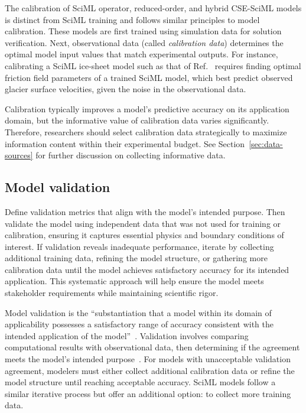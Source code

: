 The calibration of SciML operator, reduced-order, and hybrid CSE-SciML models is distinct from SciML training and follows similar principles to \CSE{} model calibration. These models are first trained using simulation data for solution verification. Next, observational data (called \emph{calibration data}) determines the optimal model input values that match experimental outputs. For instance, calibrating a SciML ice-sheet model such as that of Ref.~\cite{He_PKS_JCP_2023} requires finding optimal friction field parameters of a trained SciML model, which best predict observed glacier surface velocities, given the noise in the observational data.

Calibration typically improves a model's predictive accuracy on its application domain, but the informative value of calibration data varies significantly. Therefore, researchers should select calibration data strategically to maximize information content within their experimental budget. See Section~\ref{sec:data-sources} for further discussion on collecting informative data.

\subsection{Model validation}

\begin{essrec}
Define validation metrics that align with the model's intended purpose. Then validate the model using independent data that was not used for training or calibration, ensuring it captures essential physics and boundary conditions of interest. If validation reveals inadequate performance, iterate by collecting additional training data, refining the model structure, or gathering more calibration data until the model achieves satisfactory accuracy for its intended application. This systematic approach will help ensure the model meets stakeholder requirements while maintaining scientific rigor.
\end{essrec}

Model validation is the ``substantiation that a model within its domain of applicability possesses a satisfactory range of accuracy consistent with the intended application of the model''~\cite{Refsgaard_H_AWR_2004}. Validation involves comparing computational results with observational data, then determining if the agreement meets the model's intended purpose~\cite{Lee_et_all_AIAA_2016}. For \CSE{} models with unacceptable validation agreement, modelers must either collect additional calibration data or refine the model structure until reaching acceptable accuracy. SciML models follow a similar iterative process but offer an additional option: to collect more training data.

